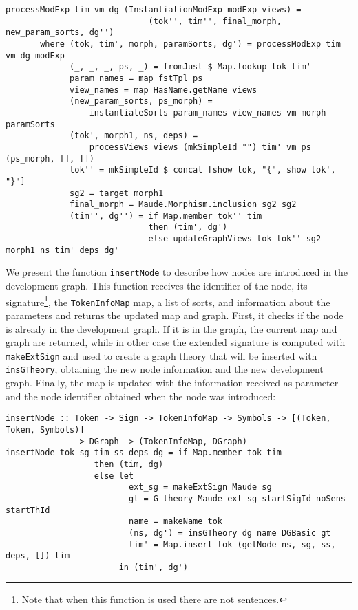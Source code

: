 \begin{itemize}
{\codesize
\begin{verbatim}
processModExp tim vm dg (InstantiationModExp modExp views) =
                             (tok'', tim'', final_morph, new_param_sorts, dg'')
       where (tok, tim', morph, paramSorts, dg') = processModExp tim vm dg modExp
             (_, _, _, ps, _) = fromJust $ Map.lookup tok tim'
             param_names = map fstTpl ps
             view_names = map HasName.getName views
             (new_param_sorts, ps_morph) = 
                 instantiateSorts param_names view_names vm morph paramSorts
             (tok', morph1, ns, deps) = 
                 processViews views (mkSimpleId "") tim' vm ps (ps_morph, [], [])
             tok'' = mkSimpleId $ concat [show tok, "{", show tok', "}"]
             sg2 = target morph1
             final_morph = Maude.Morphism.inclusion sg2 sg2
             (tim'', dg'') = if Map.member tok'' tim
                             then (tim', dg')
                             else updateGraphViews tok tok'' sg2 morph1 ns tim' deps dg'
\end{verbatim}
}

\end{itemize}

We present the function \verb"insertNode" to describe how nodes are
introduced in the development graph. This function receives the
identifier of the node, its signature\footnote{Note that when this
function is used there are not sentences.}, the \verb"TokenInfoMap" map,
a list of sorts, and information about the parameters and
returns the updated map and graph. First, it checks if
the node is already in the development graph. If it is in the graph,
the current map and graph are returned, while in other case the extended
signature is computed with \verb"makeExtSign" and used to create a graph
theory that will be inserted with \verb"insGTheory", obtaining the new
node information and the new development graph. Finally, the map is
updated with the information received as parameter and the node identifier
obtained when the node was introduced:

{\codesize
\begin{verbatim}
insertNode :: Token -> Sign -> TokenInfoMap -> Symbols -> [(Token, Token, Symbols)]
              -> DGraph -> (TokenInfoMap, DGraph)
insertNode tok sg tim ss deps dg = if Map.member tok tim
                  then (tim, dg)
                  else let
                         ext_sg = makeExtSign Maude sg
                         gt = G_theory Maude ext_sg startSigId noSens startThId
                         name = makeName tok
                         (ns, dg') = insGTheory dg name DGBasic gt
                         tim' = Map.insert tok (getNode ns, sg, ss, deps, []) tim
                       in (tim', dg')
\end{verbatim}
}

